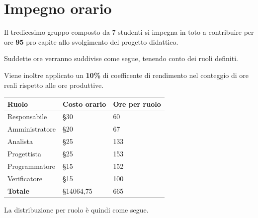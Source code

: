 \section{Impegno orario}

Il tredicesimo gruppo composto da 7 studenti si impegna in toto a contribuire per ore \textbf{95} pro capite allo svolgimento del progetto didattico.

Suddette ore verranno suddivise come segue, tenendo conto dei ruoli definiti.

Viene inoltre applicato un \textbf{10\%} di coefficente di rendimento nel conteggio di ore reali rispetto alle ore produttive.

\begin{center}
    \begin{tabularx}{10cm}{X |l|l}
        \textbf{Ruolo}  & \textbf{Costo orario} & \textbf{Ore per ruolo} \\
        \hline
        Responsabile    & §30                   & 60                     \\
        Amministratore  & §20                   & 67                     \\
        Analista        & §25                   & 133                    \\
        Progettista     & §25                   & 153                    \\
        Programmatore   & §15                   & 152                    \\
        Verificatore    & §15                   & 100                    \\
        \hline
        \textbf{Totale} & §14064,75             & 665
    \end{tabularx}
\end{center}

La distribuzione per ruolo è quindi come segue.

